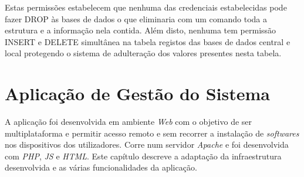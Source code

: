 \documentclass[11pt,twoside,a4paper]{report}
\begin{document}
Estas permissões estabelecem que nenhuma das credenciais estabelecidas pode fazer DROP às bases de dados o que eliminaria com um comando toda a estrutura e a informação nela contida. Além disto, nenhuma tem permissão INSERT e DELETE simultânea na tabela registos das bases de dados central e local protegendo o sistema de adulteração dos valores presentes nesta tabela.

\cleardoublepage
\chapter{Aplicação de Gestão do Sistema}
\label{chap:aplicacao}
A aplicação foi desenvolvida em ambiente  \textit{Web} com o objetivo de ser multiplataforma e permitir acesso remoto e sem recorrer a instalação de \textit{softwares} nos dispositivos dos utilizadores. Corre num servidor \textit{Apache} e foi desenvolvida com \textit{PHP}, \textit{JS} e \textit{HTML}. Este capítulo descreve a adaptação da infraestrutura desenvolvida e as várias funcionalidades da aplicação.
\end{document}
